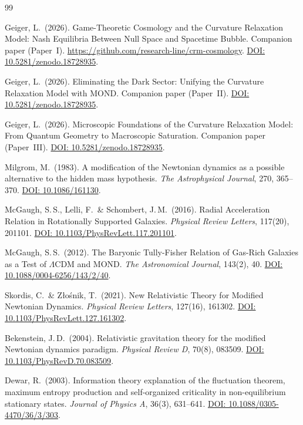 \documentclass[aps,prd,twocolumn,superscriptaddress,nofootinbib]{revtex4-2}
\begin{document}
\begin{thebibliography}{99}

Geiger, L.\ (2026).
Game-Theoretic Cosmology and the Curvature Relaxation Model: Nash Equilibria Between Null Space and Spacetime Bubble.
Companion paper (Paper~I). \url{https://github.com/research-line/crm-cosmology}.
\href{https://doi.org/10.5281/zenodo.18728935}{DOI: 10.5281/zenodo.18728935}.

Geiger, L.\ (2026).
Eliminating the Dark Sector: Unifying the Curvature Relaxation Model with MOND.
Companion paper (Paper~II).
\href{https://doi.org/10.5281/zenodo.18728935}{DOI: 10.5281/zenodo.18728935}.

Geiger, L.\ (2026).
Microscopic Foundations of the Curvature Relaxation Model: From Quantum Geometry to Macroscopic Saturation.
Companion paper (Paper~III).
\href{https://doi.org/10.5281/zenodo.18728935}{DOI: 10.5281/zenodo.18728935}.

Milgrom, M.\ (1983).
A modification of the Newtonian dynamics as a possible alternative to the hidden mass hypothesis.
\textit{The Astrophysical Journal}, 270, 365--370.
\href{https://doi.org/10.1086/161130}{DOI: 10.1086/161130}.

McGaugh, S.\,S., Lelli, F.\ \& Schombert, J.\,M.\ (2016).
Radial Acceleration Relation in Rotationally Supported Galaxies.
\textit{Physical Review Letters}, 117(20), 201101.
\href{https://doi.org/10.1103/PhysRevLett.117.201101}{DOI: 10.1103/PhysRevLett.117.201101}.

McGaugh, S.\,S.\ (2012).
The Baryonic Tully-Fisher Relation of Gas-Rich Galaxies as a Test of $\Lambda$CDM and MOND.
\textit{The Astronomical Journal}, 143(2), 40.
\href{https://doi.org/10.1088/0004-6256/143/2/40}{DOI: 10.1088/0004-6256/143/2/40}.

Skordis, C.\ \& Z{\l}o\'snik, T.\ (2021).
New Relativistic Theory for Modified Newtonian Dynamics.
\textit{Physical Review Letters}, 127(16), 161302.
\href{https://doi.org/10.1103/PhysRevLett.127.161302}{DOI: 10.1103/PhysRevLett.127.161302}.

Bekenstein, J.\,D.\ (2004).
Relativistic gravitation theory for the modified Newtonian dynamics paradigm.
\textit{Physical Review D}, 70(8), 083509.
\href{https://doi.org/10.1103/PhysRevD.70.083509}{DOI: 10.1103/PhysRevD.70.083509}.

Dewar, R.\ (2003).
Information theory explanation of the fluctuation theorem, maximum entropy production and self-organized criticality in non-equilibrium stationary states.
\textit{Journal of Physics A}, 36(3), 631--641.
\href{https://doi.org/10.1088/0305-4470/36/3/303}{DOI: 10.1088/0305-4470/36/3/303}.


\end{thebibliography}
\end{document}
